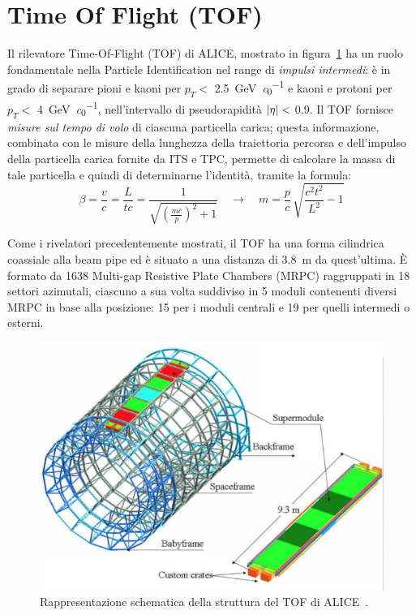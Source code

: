 \section{Time Of Flight (TOF)}
\label{sec:2-TOF}
    Il rilevatore Time-Of-Flight (TOF) di ALICE, mostrato in figura~\ref{fig:2-7-ALICE-TOF} ha un ruolo fondamentale nella Particle Identification nel range di \textit{impulsi intermedi}: è in grado di separare pioni e kaoni per $p_{T} <$ \qty[per-mode = symbol]{2.5}{\giga \eV \per \clight} e kaoni e protoni per $p_{T} <$ \qty[per-mode = symbol]{4}{\giga \eV \per \clight}, nell’intervallo di pseudorapidità $\abs{\eta} <$ \num{0.9}. Il TOF fornisce \textit{misure sul tempo di volo} di ciascuna particella carica; questa informazione, combinata con le misure della lunghezza della traiettoria percorsa e dell'impulso della particella carica fornite da ITS e TPC, permette di calcolare la massa di tale particella e quindi di determinarne l'identità, tramite la formula:
    \begin{equation}
        \beta = \frac{v}{c} = \frac{L}{tc} = \frac{1}{\sqrt{\left(\frac{mc}{p}\right)^2 +1}} \quad \to \quad m = \frac{p}{c} \, \sqrt{\frac{c^2t^2}{L^2} - 1}
    \end{equation}
    
    Come i rivelatori precedentemente mostrati, il TOF ha una forma cilindrica coassiale alla beam pipe ed è situato a una distanza di \qty{3.8}{\meter} da quest’ultima. È formato da 1638 Multi-gap Resistive Plate Chambers (MRPC) raggruppati in 18 settori azimutali, ciascuno a sua volta suddiviso in 5 moduli contenenti diversi MRPC in base alla posizione: 15 per i moduli centrali e 19 per quelli intermedi o esterni.

    \begin{figure}[h]
        \centering
        \includegraphics[width=0.62\linewidth]{res/fig/2-chapter/7-ALICE-TOF.eps}
        \caption{Rappresentazione schematica della struttura del TOF di ALICE~\cite{ALICE_TOF_2017}.}
        \label{fig:2-7-ALICE-TOF}
    \end{figure}

